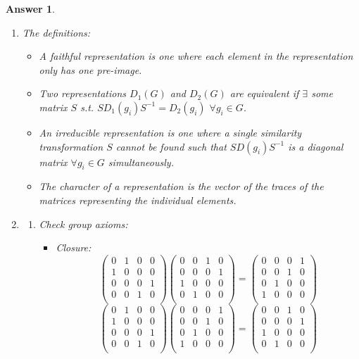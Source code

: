 \documentclass[a4paper]{article}
\newtheorem{ans}{Answer}[section]
\theoremstyle{new}
\begin{document}
\begin{ans}\leavevmode
\begin{enumerate}[label=(\roman*)]
\item The definitions:
\begin{itemize}
    \item A faithful representation is one where each element in the representation only has one pre-image.
    \item Two representations $D_1(G)$ and $D_2(G)$ are equivalent if $\exists$ some matrix $S$ s.t. $SD_1(g_i)S^{-1}=D_2(g_i)$ $\forall g_i\in G$.
    \item An irreducible representation is one where a single similarity transformation $S$ cannot be found such that $SD(g_i)S^{-1}$ is a diagonal matrix $\forall g_i\in G$ simultaneously.
    \item The character of a representation is the vector of the traces of the matrices representing the individual elements.
\end{itemize}
\item 
\begin{enumerate}[label=(\alph*)]
\item Check group axioms:
\begin{itemize}
    \item Closure: 
    $$\begin{pmatrix}0&1&0&0\\1&0&0&0\\0&0&0&1\\0&0&1&0\\\end{pmatrix}\begin{pmatrix}0&0&1&0\\0&0&0&1\\1&0&0&0\\0&1&0&0\\\end{pmatrix}=\begin{pmatrix}0&0&0&1\\0&0&1&0\\0&1&0&0\\1&0&0&0\\\end{pmatrix}$$
    $$\begin{pmatrix}0&1&0&0\\1&0&0&0\\0&0&0&1\\0&0&1&0\\\end{pmatrix}\begin{pmatrix}0&0&0&1\\0&0&1&0\\0&1&0&0\\1&0&0&0\\\end{pmatrix}=\begin{pmatrix}0&0&1&0\\0&0&0&1\\1&0&0&0\\0&1&0&0\\\end{pmatrix}$$

\end{itemize}
\end{enumerate}
\end{enumerate}
\end{ans}
\end{document}
